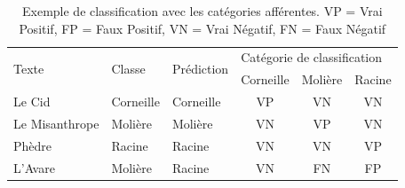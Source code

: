\begin{table}[h]
\centering
\begin{tabular}{lllccc}
\toprule
\multirow{2}{*}{Texte} & \multirow{2}{*}{Classe} & \multirow{2}{*}{Prédiction} & \multicolumn{3}{l}{Catégorie de classification} \\
                       &                         &                             & Corneille        & Molière       & Racine       \\ \midrule
Le Cid                 & Corneille               & Corneille                   & VP               & VN            & VN           \\
Le Misanthrope         & Molière                 & Molière                     & VN               & VP            & VN           \\
Phèdre                 & Racine                  & Racine                      & VN               & VN            & VP           \\
L'Avare                & Molière                 & Racine                      & VN               & FN            & FP          \\ \bottomrule
\end{tabular}
\caption{Exemple de classification avec les catégories afférentes. VP = Vrai Positif, FP = Faux Positif, VN = Vrai Négatif, FN = Faux Négatif}
\label{deep-learning:table:true-positives}
\end{table}

